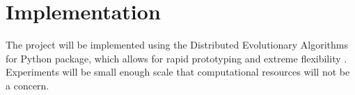 \section{Implementation}

The project will be implemented using the Distributed Evolutionary Algorithms for Python package, which allows for rapid prototyping and extreme flexibility \cite{de2012distributed}.
Experiments will be small enough scale that computational resources will not be a concern.
